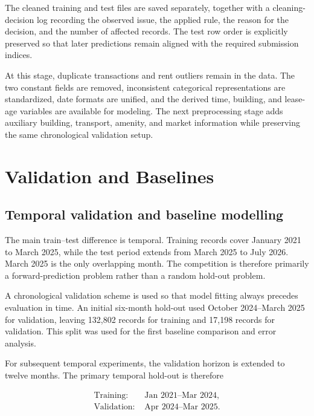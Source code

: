 \documentclass[10pt]{article}
\begin{document}
The cleaned training and test files are saved separately, together with a cleaning-decision log recording the observed issue, the applied rule, the reason for the decision, and the number of affected records.
The test row order is explicitly preserved so that later predictions remain aligned with the required submission indices.

At this stage, duplicate transactions and rent outliers remain in the data.
The two constant fields are removed, inconsistent categorical representations are standardized, date formats are unified, and the derived time, building, and lease-age variables are available for modeling.
The next preprocessing stage adds auxiliary building, transport, amenity, and market information while preserving the same chronological validation setup.

\section{Validation and Baselines}
\subsection{Temporal validation and baseline modelling}
\label{sec:temporal-validation}

The main train--test difference is temporal.
Training records cover January 2021 to March 2025, while the test period extends from March 2025 to July 2026.
March 2025 is the only overlapping month.
The competition is therefore primarily a forward-prediction problem rather than a random hold-out problem.

A chronological validation scheme is used so that model fitting always precedes evaluation in time.
An initial six-month hold-out used October 2024--March 2025 for validation, leaving 132{,}802 records for training and 17{,}198 records for validation.
This split was used for the first baseline comparison and error analysis.

For subsequent temporal experiments, the validation horizon is extended to twelve months.
The primary temporal hold-out is therefore

\begin{equation}
\begin{aligned}
\text{Training: } & \text{Jan 2021--Mar 2024},\\
\text{Validation: } & \text{Apr 2024--Mar 2025}.
\end{aligned}
\end{equation}
\end{document}
